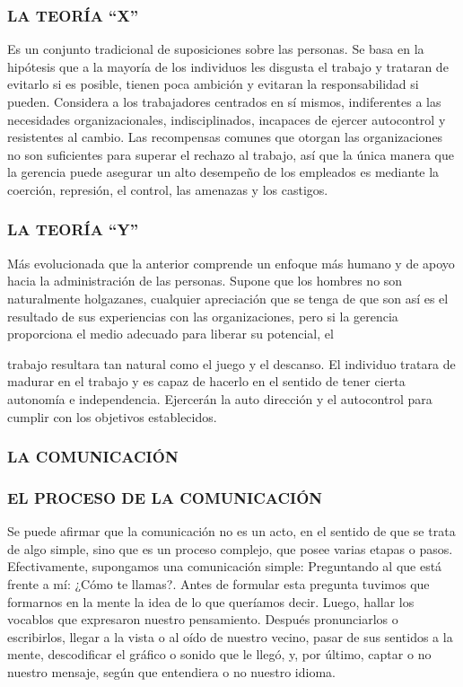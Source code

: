 \subsubsection*{LA TEORÍA “X”}
Es un conjunto tradicional de suposiciones sobre las personas. Se basa en la hipótesis que a la mayoría de los individuos les disgusta el trabajo y trataran de evitarlo si es posible, tienen poca ambición y evitaran la responsabilidad si pueden. Considera a los trabajadores centrados en sí mismos, indiferentes a las necesidades organizacionales, indisciplinados, incapaces de ejercer autocontrol y resistentes al cambio. Las recompensas comunes que otorgan las organizaciones no son suficientes para superar el rechazo al trabajo, así que la única manera que la gerencia puede asegurar un alto desempeño de los empleados es mediante la coerción, represión, el control, las amenazas y los castigos.

\subsubsection*{LA TEORÍA “Y”}
Más evolucionada que la anterior comprende un enfoque más humano y de apoyo hacia la administración de las personas. Supone que los hombres no son naturalmente holgazanes, cualquier apreciación que se tenga de que son así es el resultado de sus experiencias con las organizaciones, pero si la gerencia proporciona el medio adecuado para liberar su potencial, el



trabajo resultara tan natural como el juego y el descanso. El individuo tratara de madurar en el trabajo y es capaz de hacerlo en el sentido de tener cierta autonomía e independencia. Ejercerán la auto dirección y el autocontrol para cumplir con los objetivos establecidos.

\subsubsection*{LA COMUNICACIÓN}
\subsubsection*{EL PROCESO DE LA COMUNICACIÓN}
Se puede afirmar que la comunicación no es un acto, en el sentido de que se trata de algo simple, sino que es un proceso complejo, que posee varias etapas o pasos. Efectivamente, supongamos una comunicación simple: Preguntando al que está frente a mí: ¿Cómo te llamas?. Antes de formular esta pregunta tuvimos que formarnos en la mente la idea de lo que queríamos decir. Luego, hallar los vocablos que expresaron nuestro pensamiento. Después pronunciarlos o escribirlos, llegar a la vista o al oído de nuestro vecino, pasar de sus sentidos a la mente, descodificar el gráfico o sonido que le llegó, y, por último, captar o no nuestro mensaje, según que entendiera o no nuestro idioma.


